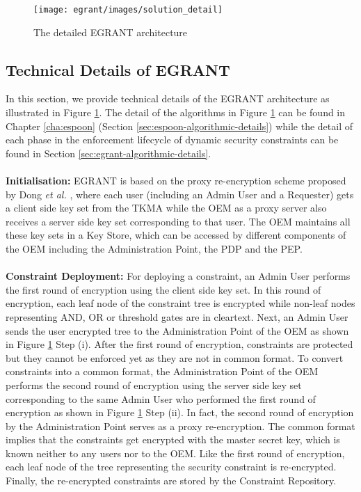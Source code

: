 \documentclass[epsfig,a4paper,11pt,titlepage]{book}
\numberwithin{algorithm}{chapter}
\begin{document}
\begin{figure} [htp]
\centering
\texttt{[image: egrant/images/solution\_detail]}
\caption[The detailed E-GRANT architecture]{The detailed \gls{EGRANT} architecture}
\label{fig:egrant-solution_detail}
\end{figure}

\subsection[Technical Details of E-GRANT]{Technical Details of \gls{EGRANT}}
In this section, we provide technical details of the \gls{EGRANT} architecture as illustrated in Figure \ref{fig:egrant-solution_detail}. The detail of the algorithms in Figure \ref{fig:egrant-solution_detail} can be found in Chapter \ref{cha:espoon} (Section \ref{sec:espoon-algorithmic-details}) while the detail of each phase in the enforcement lifecycle of dynamic security constraints can be found in Section \ref{sec:egrant-algorithmic-details}. \\ \\
\noindent \textbf{Initialisation:} \gls{EGRANT} is based on the proxy re-encryption scheme proposed by Dong \emph{et al.} \cite{Dong:2011}, where each user (including an Admin User and a Requester) gets a client side key set from the \gls{TKMA} while the \gls{OEM} as a proxy server also receives a server side key set corresponding to that user. The \gls{OEM} maintains all these key sets in a Key Store, which can be accessed by different components of the \gls{OEM} including the Administration Point, the \gls{PDP} and the \gls{PEP}. \\ \\
\noindent \textbf{Constraint Deployment:} For deploying a constraint, an Admin User performs the first round of encryption using the client side key set. In this round of encryption, each leaf node of the constraint tree is encrypted while non-leaf nodes representing AND, OR or threshold gates are in cleartext. Next, an Admin User sends the user encrypted tree to the Administration Point of the \gls{OEM} as shown in Figure \ref{fig:egrant-solution_detail} Step (i). After the first round of encryption, constraints are protected but they cannot be enforced yet as they are not in common format. To convert constraints into a common format, the Administration Point of the \gls{OEM} performs the second round of encryption using the server side key set corresponding to the same Admin User who performed the first round of encryption as shown in Figure \ref{fig:egrant-solution_detail} Step (ii). In fact, the second round of encryption by the Administration Point serves as a proxy re-encryption. The common format implies that the constraints get encrypted with the master secret key, which is known neither to any users nor to the \gls{OEM}. Like the first round of encryption, each leaf node of the tree representing the security constraint is re-encrypted. Finally, the re-encrypted constraints are stored by the Constraint Repository.
\end{document}
